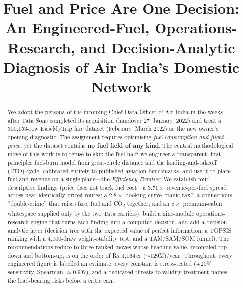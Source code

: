 \documentclass[conference]{IEEEtran}
\newcommand{\INR}{\mbox{Rs.}}
\newcommand{\EUR}{\texteuro}
\newcommand{\co}{\mbox{CO\textsubscript{2}}}
\newcommand{\cr}{\,cr}        %
\begin{document}
\title{Fuel and Price Are One Decision:\\ An Engineered-Fuel, Operations-Research, and Decision-Analytic\\ Diagnosis of Air India's Domestic Network}

\author{%
}

\maketitle

\begin{abstract}
We adopt the persona of the incoming Chief Data Officer of Air India in the weeks after Tata Sons completed its acquisition (handover 27~January~2022) and treat a 300{,}153-row EaseMyTrip fare dataset (February--March 2022) as the new owner's opening diagnostic. The assignment requires optimising \emph{fuel consumption and flight price}, yet the dataset contains \textbf{no fuel field of any kind}. The central methodological move of this work is to refuse to skip the fuel half: we engineer a transparent, first-principles fuel-burn model from great-circle distance and the landing-and-takeoff (LTO) cycle, calibrated entirely to published aviation benchmarks, and use it to place fuel and revenue on a single plane---the \emph{Efficiency Frontier}. We establish four descriptive findings (price does not track fuel cost---a $3.71\times$ revenue-per-fuel spread across near-identically-priced routes; a $2.8\times$ booking-curve ``panic tax''; a connections ``double-crime'' that raises fare, fuel and \co{} together; and an $8\times$ premium-cabin whitespace supplied only by the two Tata carriers), build a nine-module operations-research engine that turns each finding into a computed decision, and add a decision-analytic layer (decision tree with the expected value of perfect information, a TOPSIS ranking with a 4{,}000-draw weight-stability test, and a TAM/SAM/SOM funnel). The recommendations reduce to three ranked moves whose headline value, reconciled top-down and bottom-up, is on the order of \INR{}\,1{,}164\cr{} ($\sim$\EUR{}129M)/year. Throughout, every engineered figure is labelled an estimate, every constant is stress-tested ($\pm20\%$ sensitivity, Spearman $\approx 0.997$), and a dedicated threats-to-validity treatment names the load-bearing risks before a critic can.
\end{abstract}
\end{document}

